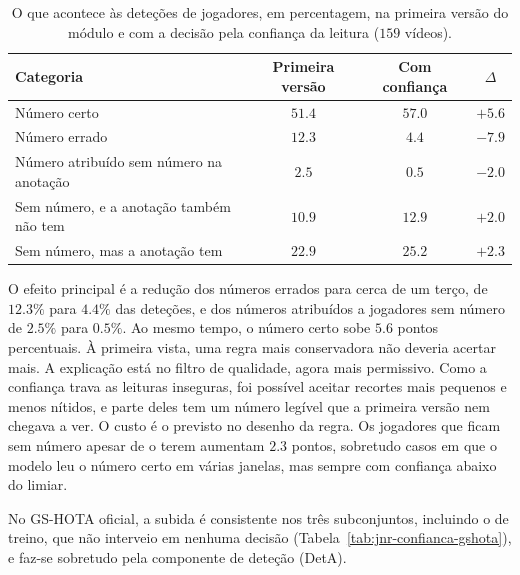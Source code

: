 \begin{table}[htbp]
    \centering
    \caption{O que acontece às deteções de jogadores, em percentagem, na primeira versão do módulo e
    com a decisão pela confiança da leitura ($159$ vídeos).}
    \label{tab:jnr-categorias}
    \begin{tabular}{|l|c|c|c|}
        \hline
        \textbf{Categoria} & \textbf{Primeira versão} & \textbf{Com confiança} & \textbf{$\Delta$} \\
        \hline
        Número certo                               & $51.4$ & $57.0$ & $+5.6$ \\
        \hline
        Número errado                              & $12.3$ & $4.4$  & $-7.9$ \\
        \hline
        Número atribuído sem número na anotação    & $2.5$  & $0.5$  & $-2.0$ \\
        \hline
        Sem número, e a anotação também não tem    & $10.9$ & $12.9$ & $+2.0$ \\
        \hline
        Sem número, mas a anotação tem             & $22.9$ & $25.2$ & $+2.3$ \\
        \hline
    \end{tabular}
\end{table}

O efeito principal é a redução dos números errados para cerca de um terço, de $12.3\%$ para
$4.4\%$ das deteções, e dos números atribuídos a jogadores sem número de $2.5\%$ para $0.5\%$.
Ao mesmo tempo, o número certo sobe $5.6$ pontos percentuais.
À primeira vista, uma regra mais conservadora não deveria acertar mais. A explicação está no filtro
de qualidade, agora mais permissivo. Como a confiança trava as leituras inseguras, foi possível
aceitar recortes mais pequenos e menos nítidos, e parte deles tem um número legível que a primeira
versão nem chegava a ver. O custo é o previsto no desenho da regra. Os jogadores que
ficam sem número apesar de o terem aumentam $2.3$ pontos, sobretudo casos em que o modelo leu o
número certo em várias janelas, mas sempre com confiança abaixo do limiar.

No GS-HOTA oficial, a subida é consistente nos três subconjuntos, incluindo o de treino, que não
interveio em nenhuma decisão (Tabela~\ref{tab:jnr-confianca-gshota}), e faz-se sobretudo pela componente
de deteção (DetA).

